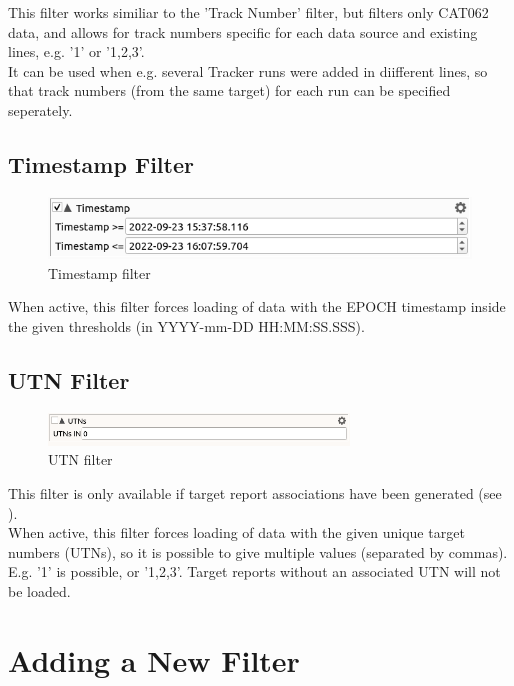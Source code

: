 This filter works similiar to the 'Track Number' filter, but filters only CAT062 data, and allows for track numbers specific for each data source and existing lines, e.g. '1' or '1,2,3'.\\

It can be used when e.g. several Tracker runs were added in diifferent lines, so that track numbers (from the same target) for each run can be specified seperately. \\

\subsection{Timestamp Filter}

\begin{figure}[H]
  \center
    \includegraphics[width=12cm,frame]{figures/filter_timestamp.png}
  \caption{Timestamp filter}
\end{figure}

When active, this filter forces loading of data with the EPOCH timestamp inside the given thresholds (in YYYY-mm-DD HH:MM:SS.SSS).

\subsection{UTN Filter}

\begin{figure}[H]
  \center
    \includegraphics[width=8cm,frame]{figures/filter_utn.png}
  \caption{UTN filter}
\end{figure}

This filter is only available if target report associations have been generated (see ). \\

When active, this filter forces loading of data with the given unique target numbers (UTNs), so it is possible to give multiple values (separated by commas). E.g. '1' is possible, or '1,2,3'. Target reports without an associated UTN will not be loaded. \\

\section{Adding a New Filter}


